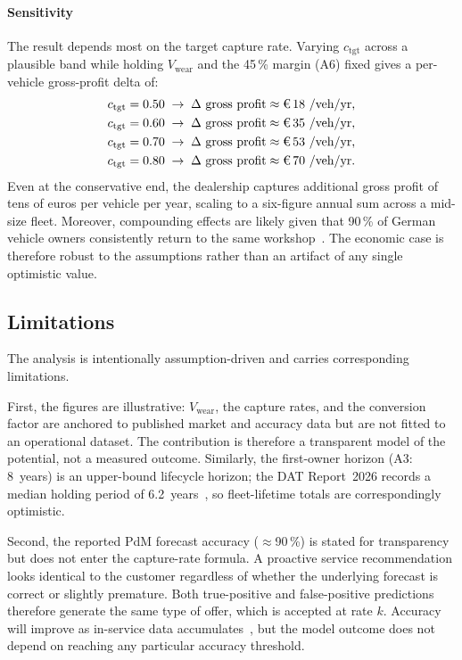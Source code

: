 \documentclass[conference,a4paper]{IEEEtran}
\newcommand{\eur}{\ifmmode\text{\texteuro}\else\texteuro\fi}
\newcommand{\cSoll}{c_{\mathrm{tgt}}}
\begin{document}
\paragraph*{Sensitivity}
The result depends most on the target capture rate. Varying $\cSoll$ across a
plausible band while holding $V_{\mathrm{wear}}$ and the 45\,\% margin (A6) fixed
gives a per-vehicle gross-profit delta of:
\begin{align*}
\cSoll = 0.50 &\;\rightarrow\; \Delta \text{ gross profit} \approx \eur\,18~\text{/veh/yr,} \\
\cSoll = 0.60 &\;\rightarrow\; \Delta \text{ gross profit} \approx \eur\,35~\text{/veh/yr,} \\
\cSoll = 0.70 &\;\rightarrow\; \Delta \text{ gross profit} \approx \eur\,53~\text{/veh/yr,} \\
\cSoll = 0.80 &\;\rightarrow\; \Delta \text{ gross profit} \approx \eur\,70~\text{/veh/yr.}
\end{align*}
Even at the conservative end, the dealership captures additional gross profit
of tens of euros per vehicle per year, scaling to a six-figure
annual sum across a mid-size fleet. Moreover, compounding effects are likely given that 90\,\% of German vehicle owners consistently return to the same
workshop~\cite{dat2026report}. The economic case is therefore robust to the
assumptions rather than an artifact of any single optimistic value.

\subsection{Limitations}\label{sec:lim}

The analysis is intentionally assumption-driven and carries corresponding
limitations. 

First, the figures are illustrative: $V_{\mathrm{wear}}$, the
capture rates, and the conversion factor are anchored to published market and
accuracy data but are not fitted to an operational dataset. The contribution is therefore a transparent model of the
potential, not a measured outcome. Similarly, the first-owner horizon (A3: 8~years) is an
upper-bound lifecycle horizon; the DAT Report~2026 records a median holding
period of 6.2~years~\cite{dat2026report}, so fleet-lifetime totals are
correspondingly optimistic. 

Second, the reported PdM forecast accuracy ($\approx$90\,\%) is stated for
transparency but does not enter the capture-rate formula. A proactive service recommendation looks identical to the customer
regardless of whether the underlying forecast is correct or slightly
premature. Both true-positive and false-positive predictions therefore
generate the same type of offer, which is accepted at rate $k$. Accuracy
will improve as in-service data accumulates~\cite{abougrad2026xai},
but the model outcome does not depend on reaching any particular accuracy
threshold. 
\end{document}
